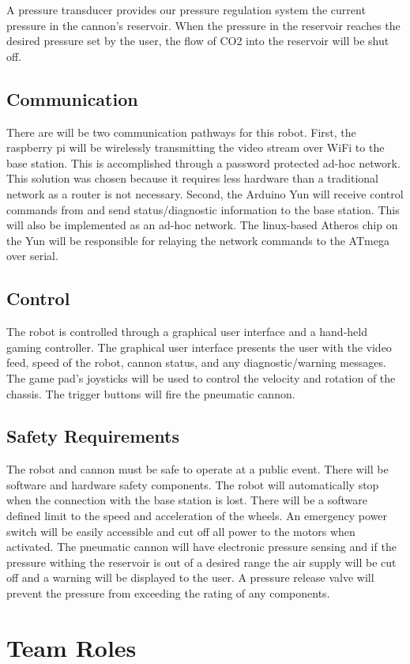 \documentclass[letterpaper,12pt]{article}
\begin{document}
 A pressure transducer provides our pressure regulation system the current pressure in the cannon's reservoir. When the pressure in the reservoir reaches the desired pressure set by the user, the flow of CO2 into the reservoir will be shut off. 
\subsection{Communication}
There are will be two communication pathways for this robot. First, the raspberry pi will be wirelessly transmitting the video stream over WiFi to the base station. This is accomplished through a password protected ad-hoc network. This solution was chosen because it requires less hardware than a traditional network as a router is not necessary. 
Second, the Arduino Yun will receive control commands from and send status/diagnostic information to the base station. This will also be implemented as an ad-hoc network. The linux-based Atheros chip on the Yun will be responsible for relaying the network commands to the ATmega over serial.
\subsection{Control}
The robot is controlled through a graphical user interface and a hand-held gaming controller. The graphical user interface presents the user with the video feed, speed of the robot, cannon status, and any diagnostic/warning messages.  The game pad's joysticks will be used to control the velocity and rotation of the chassis. The trigger buttons will fire the pneumatic cannon.
\subsection{Safety Requirements}
The robot and cannon must be safe to operate at a public event. There will be software and hardware safety components. The robot will automatically stop when the connection with the base station is lost. There will be a software defined limit to the speed and acceleration of the wheels. An emergency power switch will be easily accessible and cut off all power to the motors when activated. The pneumatic cannon will have electronic pressure sensing and if the pressure withing the reservoir is out of a desired range the air supply will be cut off and a warning will be displayed to the user. A pressure release valve will prevent the pressure from exceeding the rating of any components.

\section{Team Roles}
\end{document}
